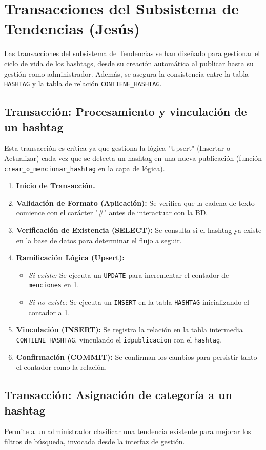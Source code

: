 \section{Transacciones del Subsistema de Tendencias (Jesús)}

Las transacciones del subsistema de Tendencias se han diseñado para gestionar el ciclo de vida de los hashtags, desde su creación automática al publicar hasta su gestión como administrador. Además, se asegura la consistencia entre la tabla \texttt{HASHTAG} y la tabla de relación \texttt{CONTIENE\_HASHTAG}.

\subsection{Transacción: Procesamiento y vinculación de un hashtag}
Esta transacción es crítica ya que gestiona la lógica "Upsert" (Insertar o Actualizar) cada vez que se detecta un hashtag en una nueva publicación (función \texttt{crear\_o\_mencionar\_hashtag} en la capa de lógica).

\begin{enumerate}
    \item \textbf{Inicio de Transacción.}
    \item \textbf{Validación de Formato (Aplicación):} Se verifica que la cadena de texto comience con el carácter "\#" antes de interactuar con la BD.
    \item \textbf{Verificación de Existencia (SELECT):} Se consulta si el hashtag ya existe en la base de datos para determinar el flujo a seguir.
    \item \textbf{Ramificación Lógica (Upsert):}
    \begin{itemize}
        \item \textit{Si existe:} Se ejecuta un \texttt{UPDATE} para incrementar el contador de \texttt{menciones} en 1.
        \item \textit{Si no existe:} Se ejecuta un \texttt{INSERT} en la tabla \texttt{HASHTAG} inicializando el contador a 1.
    \end{itemize}
    \item \textbf{Vinculación (INSERT):} Se registra la relación en la tabla intermedia \texttt{CONTIENE\_HASHTAG}, vinculando el \texttt{idpublicacion} con el \texttt{hashtag}.
    \item \textbf{Confirmación (COMMIT):} Se confirman los cambios para persistir tanto el contador como la relación.
\end{enumerate}
\subsection{Transacción: Asignación de categoría a un hashtag} Permite a un administrador clasificar una tendencia existente para mejorar los filtros de búsqueda, invocada desde la interfaz de gestión.

